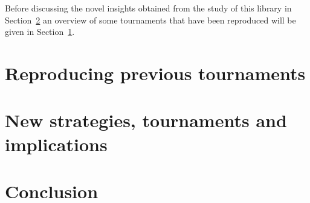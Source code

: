 \documentclass{article}
\begin{document}
Before discussing the novel insights obtained from the study of this library in
Section~\ref{sec:new-strategies-and-implications} an overview of some
tournaments that have been reproduced will be given in
Section~\ref{sec:reproducing-previous-tournaments}.

\section{Reproducing previous tournaments}\label{sec:reproducing-previous-tournaments}

\section{New strategies, tournaments and implications}\label{sec:new-strategies-and-implications}

\section{Conclusion}\label{sec:conclusion}

\printbibliography
\end{document}
